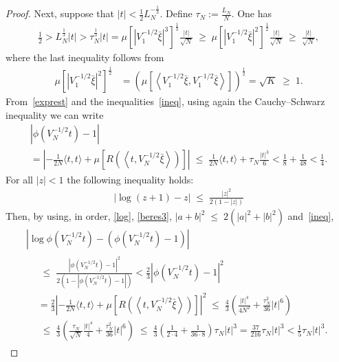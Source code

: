 \documentclass[AHL,Unicode,longabstracts,published]{cedram}
\renewcommand{\leq}{\;\leqslant\;}
\renewcommand{\geq}{\;\geqslant\;}
\newcommand{\scalar}[2]{\langle #1, #2\rangle}
\begin{document}
\begin{proof}
Next, suppose that $|t|< \frac{1}{2}L_N^{-\frac{1}{3}}.$ Define $\tau_N := \frac{L_N}{N}.$ One has
\begin{align}\label{ineq}
\frac{1}{2}>L_N^{\frac{1}{3}}|t|>\tau_N^{\frac{1}{3}}|t|=\mu\left[\left|V_1^{-1/2}\bar{\xi}\right|^3\right]^{\frac{1}{3}}\frac{|t|}{\sqrt{N}}\geq \mu\left[\left|V_1^{-1/2}\bar{\xi}\right|^2\right]^{\frac{1}{2}}\frac{|t|}{\sqrt{N}}\geq \frac{|t|}{\sqrt{N}},
\end{align}
where the last inequality follows from
\begin{align}
\mu\left[\left|V_1^{-1/2}\bar{\xi}\right|^2\right]^{\frac{1}{2}} &= \left(\mu\left[\left\langle V_1^{-1/2}\bar{\xi}, V_1^{-1/2}\bar{\xi}\right\rangle \right]\right)^{\frac{1}{2}} = \sqrt{K}\geq 1.
\end{align}
From~\eqref{exprest} and the inequalities~\eqref{ineq}, using again the Cauchy--Schwarz inequality we can write
\begin{multline}\label{beres3}
\left|\phi\left(V_N^{-1/2}t\right)-1\right|
\\
= \left|-\frac1{2N}\scalar{t}{t} + \mu\left[R\left(\left\langle t,V_N^{-1/2}\bar{\xi}\right\rangle\right)\right]\right| \leq \frac{1}{2N}\scalar{t}{t} + \tau_N\frac{|t|^3}{6} < \frac{1}{8}+\frac{1}{48}<\frac{1}{4}.
\end{multline}
For all $|z|<1$ the following inequality holds:
\begin{align}\label{log}
\left|\log(z+1)-z\right| \leq \frac{|z|^2}{2(1-|z|)}
\end{align}
Then, by using, in order, \eqref{log}, \eqref{beres3}, $|a+b|^2\leq2(|a|^2+|b|^2)$ and~\eqref{ineq},
\begin{multline}
\left|\log\phi\left(V_N^{-1/2}t\right)-\left(\phi\left(V_N^{-1/2}t\right)-1\right)\right|\\
\begin{aligned}
&\leq \frac{\left|\phi\left(V_N^{-1/2}t\right)-1\right|^2}{2\left(1-\left|\phi\left(V_N^{-1/2}t\right)-1\right|\right)} <\frac{2}{3}\left|\phi\left(V_N^{-1/2}t\right)-1\right|^2 \\
&=\frac{2}{3}\left|-\frac{1}{2N}\scalar{t}{t} +\mu\left[R\left(\left\langle t,V_N^{-1/2}\bar{\xi}\right\rangle \right)\right] \right|^2 \leq \frac{4}{3}\left(\frac{|t|^4}{4N^2}+ \frac{\tau_{N}^2}{36}|t|^6\right) \\
&\leq \frac{4}{3}\left(\frac{\tau_N}{\sqrt{N}}\frac{|t|^4}{4} + \frac{\tau_{N}^2}{36}|t|^6\right) \leq \frac{4}{3}\left(\frac{1}{2\cdot4}+\frac{1}{36\cdot8}\right)\tau_N|t|^3 =\frac{37}{216}\tau_N|t|^3 < \frac{1}{5}\tau_N|t|^3.

\end{aligned}
\end{multline}
\end{proof}
\end{document}
